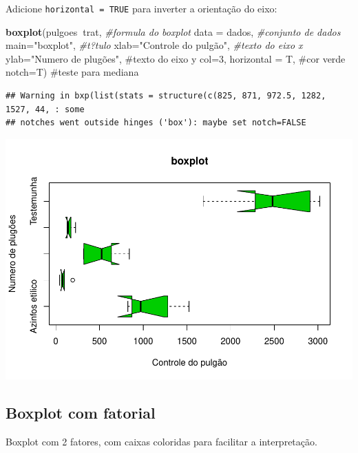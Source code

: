 \documentclass[
]{book}
\newenvironment{Shaded}{\begin{snugshade}}{\end{snugshade}}
\newcommand{\CommentTok}[1]{\textcolor[rgb]{0.56,0.35,0.01}{\textit{#1}}}
\newcommand{\DataTypeTok}[1]{\textcolor[rgb]{0.13,0.29,0.53}{#1}}
\newcommand{\KeywordTok}[1]{\textcolor[rgb]{0.13,0.29,0.53}{\textbf{#1}}}
\newcommand{\NormalTok}[1]{#1}
\newcommand{\OperatorTok}[1]{\textcolor[rgb]{0.81,0.36,0.00}{\textbf{#1}}}
\newcommand{\StringTok}[1]{\textcolor[rgb]{0.31,0.60,0.02}{#1}}
\begin{document}
Adicione \texttt{horizontal\ =\ TRUE} para inverter a orientação do eixo:

\begin{Shaded}
\begin{Highlighting}[]
\KeywordTok{boxplot}\NormalTok{(pulgoes}\OperatorTok{~}\NormalTok{trat,              }\CommentTok{#formula do boxplot}
        \DataTypeTok{data =}\NormalTok{ dados,              }\CommentTok{#conjunto de dados}
        \DataTypeTok{main=}\StringTok{"boxplot"}\NormalTok{,            }\CommentTok{#t?tulo}
        \DataTypeTok{xlab=}\StringTok{"Controle do pulgão"}\NormalTok{, }\CommentTok{#texto do eixo x }
        \DataTypeTok{ylab=}\StringTok{"Numero de plugões",  #texto do eixo y}
\StringTok{        col=3, horizontal = T,     #cor verde  }
\StringTok{        notch=T)                   #teste para mediana}
\end{Highlighting}
\end{Shaded}

\begin{verbatim}
## Warning in bxp(list(stats = structure(c(825, 871, 972.5, 1282, 1527, 44, : some
## notches went outside hinges ('box'): maybe set notch=FALSE
\end{verbatim}

\includegraphics{TudodoR_files/figure-latex/unnamed-chunk-172-1.pdf}

\hypertarget{boxplot-com-fatorial}{%
\subsection{Boxplot com fatorial}\label{boxplot-com-fatorial}}

Boxplot com 2 fatores, com caixas coloridas para facilitar a interpretação.
\end{document}
